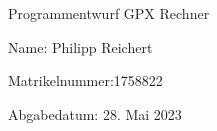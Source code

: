 \begin{titlepage}

\vspace*{\fill}



\huge{Programmentwurf GPX Rechner}

\normalsize
\vspace{1cm}
Name: Philipp Reichert

Matrikelnummer:1758822

Abgabedatum: 28. Mai 2023
\vfill

\end{titlepage}